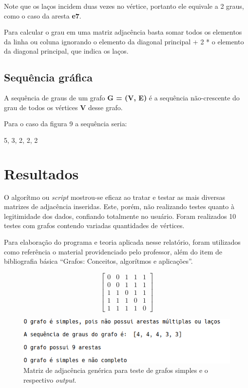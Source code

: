 \documentclass[a4paper, 12pt]{article}
\begin{document}
    Note que os laços incidem duas vezes no vértice, portanto ele equivale a 2 graus, como o caso da aresta \textbf{e7}.
    
    \indent Para calcular o grau em uma matriz adjacência basta somar todos os elementos da linha ou coluna ignorando o elemento da diagonal principal + 2 * o elemento da diagonal principal, que indica os laços.
    
\subsection{Sequência gráfica}

    A sequência de graus de um grafo \textbf{G = (V, E)} é a sequência não-crescente do grau de todos os vértices \textbf{V} desse grafo. 
    
    \indent Para o caso da figura 9 a sequência seria:
    
    \begin{center}
     5, 3, 2, 2, 2
    \end{center}

\section{Resultados}

O algorítmo ou \textit{script} mostrou-se eficaz ao tratar e testar as mais diversas matrizes de adjacência inseridas. Este, porém, não realizando testes quanto à legitimidade dos dados, confiando totalmente no usuário. Foram realizados 10 testes com grafos contendo variadas quantidades de vértices.

Para elaboração do programa e teoria aplicada nesse relatório, foram utilizados como referência o material providenciado pelo professor, além do item de bibliografia básica ``Grafos: Conceitos, algorítmos e aplicações''. 

\begin{figure}[hbt!]
\begin{multicols}{2}
	\[
	\begin{bmatrix}
	0	&0	&1 	&1	&1\\
	0	&0	&1	&1 	&1\\
	1	&1	&0	&1  	&1\\
	1	&1	&1	&0	&1\\
	1	&1	&1	&1	&0

\end{bmatrix} \]

\includegraphics[width=\linewidth]{outputprog.png}
\end{multicols}
\caption{Matriz de adjacência genérica para teste de grafos simples e o respectivo \textit{output}. }
\end{figure}
\end{document}

